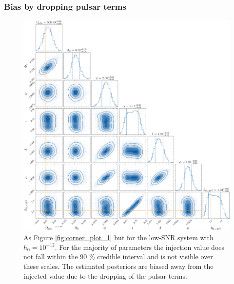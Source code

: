 \documentclass[fleqn,usenatbib,useAMS]{mnras}
\begin{document}
\subsubsection{Bias by dropping pulsar terms}\label{sec:bias}

\begin{figure}
	\includegraphics[width=\textwidth, height =\textwidth]{images/large_h_example}
	\caption{As Figure \ref{fig:corner_plot_1} but for the low-SNR system with $h_0 = 10^{-12}$. For the majority of parameters the injection value does not fall within the 90 \% credible interval and is not visible over these scales. The estimated posteriors are biased away from the injected value due to the dropping of the pulsar terms.} 
	\label{fig:bias_for_large_h}
\end{figure}
\end{document}
